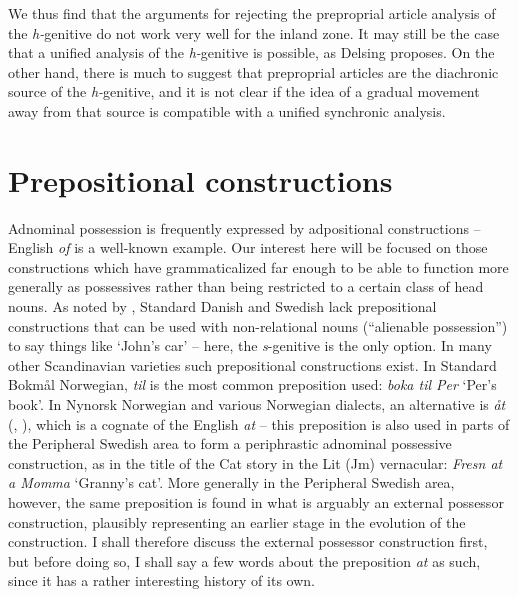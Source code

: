 \begin{styleBodytextC}
We thus find that the arguments for rejecting the preproprial article analysis of the \textit{h-}genitive do not work very well for the inland zone. It may still be the case that a unified analysis of the \textit{h-}genitive is possible, as Delsing proposes. On the other hand, there is much to suggest that preproprial articles are the diachronic source of the \textit{h-}genitive, and it is not clear if the idea of a gradual movement away from that source is compatible with a unified synchronic analysis. 

\end{styleBodytextC}

\section{Prepositional constructions}
\label{bkm:Ref136433022}
\begin{styleBodyTextFirst}
Adnominal possession is frequently expressed by adpositional constructions – English \textit{of }is a well-known example. Our interest here will be focused on those constructions which have grammaticalized far enough to be able to function more generally as possessives rather than being restricted to a certain class of head nouns. As noted by \citet[43]{Delsing2003a}, Standard Danish and Swedish lack prepositional constructions that can be used with non-relational nouns (“alienable possession”) to say things like ‘John’s car’ – here, the \textit{s}{}-genitive is the only option. In many other Scandinavian varieties such prepositional constructions exist. In Standard Bokmål Norwegian, \textit{til} is the most common preposition used: \textit{boka til Per} ‘Per’s book’. In Nynorsk Norwegian and various Norwegian dialects, an alternative is \textit{åt }(\citet[263]{FaarlundEtAl1997}, \citet[43]{Delsing2003a}), which is a cognate of the English \textit{at} – this preposition is also used in parts of the Peripheral Swedish area to form a periphrastic adnominal possessive construction, as in the title of the Cat story in the Lit (Jm) vernacular: \textit{Fresn at a Momma }‘Granny’s cat’. More generally in the Peripheral Swedish area, however, the same preposition is found in what is arguably an external possessor construction, plausibly representing an earlier stage in the evolution of the construction. I shall therefore discuss the external possessor construction first, but before doing so, I shall say a few words about the preposition \textit{at }as such, since it has a rather interesting history of its own. 

\end{styleBodyTextFirst}


